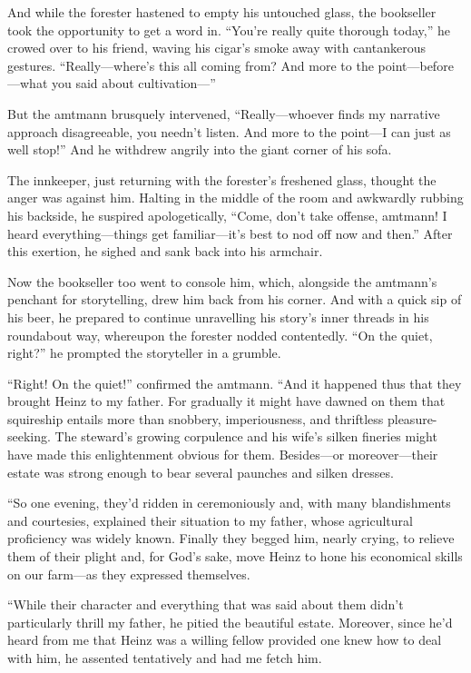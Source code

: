 \documentclass[12pt,a4paper]{article}
\begin{document}
And while the forester hastened to empty his untouched glass, the bookseller took the opportunity to get a word in. “You’re really quite thorough today,” he crowed over to his friend, waving his cigar’s smoke away with cantankerous gestures. “Really—where’s this all coming from? And more to the point—before—what you said about cultivation—”

But the amtmann brusquely intervened, “Really—whoever finds my narrative approach disagreeable, you needn’t listen. And more to the point—I can just as well stop!” And he withdrew angrily into the giant corner of his sofa.

The innkeeper, just returning with the forester’s freshened glass, thought the anger was against him. Halting in the middle of the room and awkwardly rubbing his backside, he suspired apologetically, “Come, don’t take offense, amtmann! I heard everything—things get familiar—it’s best to nod off now and then.” After this exertion, he sighed and sank back into his armchair.

Now the bookseller too went to console him, which, alongside the amtmann’s penchant for storytelling, drew him back from his corner. And with a quick sip of his beer, he prepared to continue unravelling his story’s inner threads in his roundabout way, whereupon the forester nodded contentedly. “On the quiet, right?” he prompted the storyteller in a grumble.

“Right! On the quiet!” confirmed the amtmann. “And it happened thus that they brought Heinz to my father. For gradually it might have dawned on them that squireship entails more than snobbery, imperiousness, and thriftless pleasure-seeking. The steward’s growing corpulence and his wife’s silken fineries might have made this enlightenment obvious for them. Besides—or moreover—their estate was strong enough to bear several paunches and silken dresses.

“So one evening, they’d ridden in ceremoniously and, with many blandishments and courtesies, explained their situation to my father, whose agricultural proficiency was widely known. Finally they begged him, nearly crying, to relieve them of their plight and, for God’s sake, move Heinz to hone his economical skills on our farm—as they expressed themselves.

“While their character and everything that was said about them didn’t particularly thrill my father, he pitied the beautiful estate. Moreover, since he’d heard from me that Heinz was a willing fellow provided one knew how to deal with him, he assented tentatively and had me fetch him.
\end{document}
